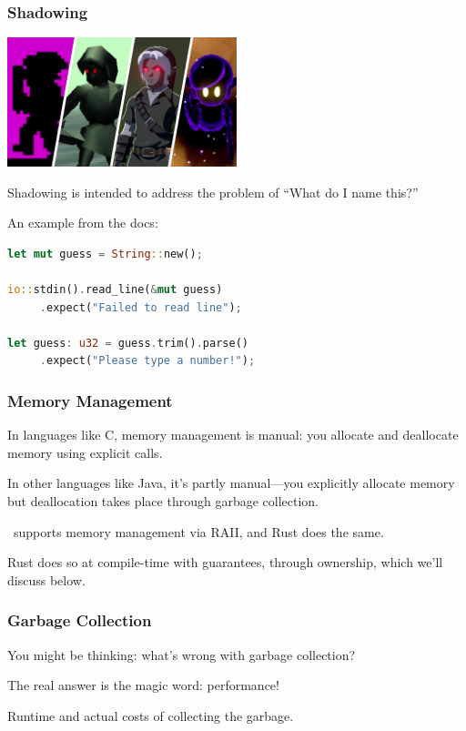 \begin{frame}[fragile]
\frametitle{Shadowing}

\begin{center}
	\includegraphics[width=0.5\textwidth]{images/darklink.jpg}
\end{center}
\alert{Shadowing} is intended to address the problem of ``What do I name this?''

An example from the docs:

\begin{lstlisting}[language=Rust]
let mut guess = String::new();

io::stdin().read_line(&mut guess)
     .expect("Failed to read line");

let guess: u32 = guess.trim().parse()
     .expect("Please type a number!");
\end{lstlisting}

\end{frame}


\begin{frame}
\frametitle{Memory Management}

In languages like C, memory management is manual: you allocate and deallocate memory using explicit calls.

In other languages like Java, it's partly manual---you explicitly allocate memory but deallocation takes place through garbage collection. 

\CPP~supports memory management via RAII, and Rust does the same.

Rust does so at compile-time with guarantees, through ownership, which we'll discuss below.
\end{frame}


\begin{frame}
\frametitle{Garbage Collection}

You might be thinking: what's wrong with garbage collection?

The real answer is the magic word: performance!

Runtime and actual costs of collecting the garbage.

\end{frame}






